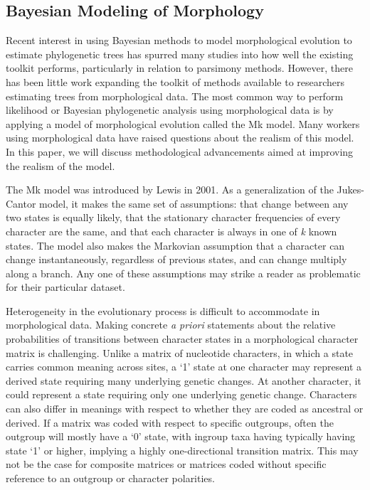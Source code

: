 \documentclass[]{article}
\begin{document}
\subsection{Bayesian Modeling of Morphology}
	Recent interest in using Bayesian methods to model morphological evolution to estimate phylogenetic trees has spurred many studies into how well the existing toolkit performs, particularly in relation to parsimony methods.
	However, there has been little work expanding the toolkit of methods available to researchers estimating trees from morphological data. 
	The most common way to perform likelihood or Bayesian phylogenetic analysis using morphological data is by applying a model of morphological evolution called the Mk model.
	Many workers using morphological data have raised questions about the realism of this model.
	In this paper, we will discuss methodological advancements aimed at improving the realism of the model. \par
	The Mk model was introduced by Lewis in 2001.
	As a generalization of the Jukes-Cantor model, it makes the same set of assumptions: that change between any two states is equally likely, that the stationary character frequencies of every character are the same, and that each character is always in one of \textit{k} known states.
	The model also makes the Markovian assumption that a character can change instantaneously, regardless of previous states, and can change multiply along a branch. 
	Any one of these assumptions may strike a reader as problematic for their particular dataset. \par
	Heterogeneity in the evolutionary process is difficult to accommodate in morphological data. 
	Making concrete \textit{a priori} statements about the relative probabilities of transitions between character states in a morphological character matrix is challenging. 
	Unlike a matrix of nucleotide characters, in which a state carries common meaning across sites, a `1' state at one character may represent a derived state requiring many underlying genetic changes.
	At another character, it could represent a state requiring only one underlying genetic change.
	Characters can also differ in meanings with respect to whether they are coded as ancestral or derived.
	If a matrix was coded with respect to specific outgroups, often the outgroup will mostly have a `0' state, with ingroup taxa having typically having state `1' or higher, implying a highly one-directional transition matrix.
	This may not be the case for composite matrices or matrices coded without specific reference to an outgroup or character polarities.
\end{document}
